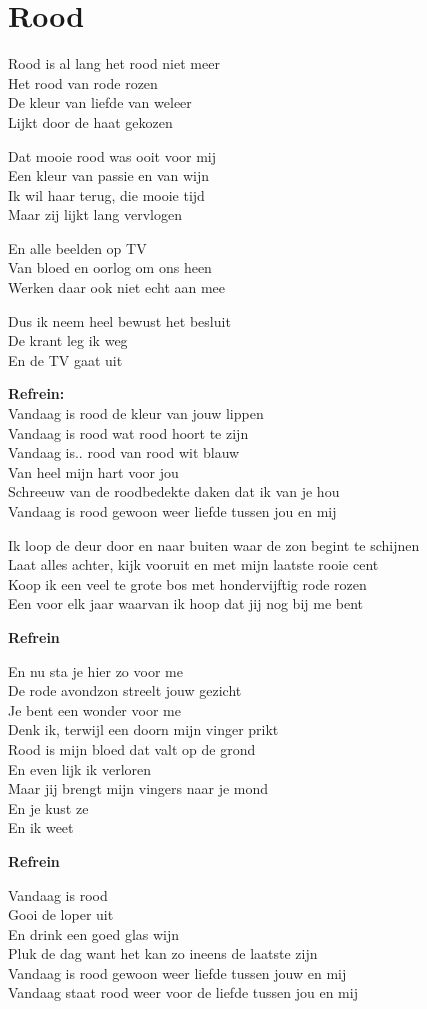 \section{Rood}
Rood is al lang het rood niet meer\\
Het rood van rode rozen\\
De kleur van liefde van weleer\\
Lijkt door de haat gekozen

Dat mooie rood was ooit voor mij\\
Een kleur van passie en van wijn\\
Ik wil haar terug, die mooie tijd\\
Maar zij lijkt lang vervlogen

En alle beelden op TV\\
Van bloed en oorlog om ons heen\\
Werken daar ook niet echt aan mee

Dus ik neem heel bewust het besluit\\
De krant leg ik weg\\
En de TV gaat uit

\textbf{Refrein:}\\
Vandaag is rood de kleur van jouw lippen\\
Vandaag is rood wat rood hoort te zijn\\
Vandaag is.. rood van rood wit blauw\\
Van heel mijn hart voor jou\\
Schreeuw van de roodbedekte daken dat ik van je hou\\
Vandaag is rood gewoon weer liefde tussen jou en mij

Ik loop de deur door en naar buiten waar de zon begint te schijnen\\
Laat alles achter, kijk vooruit en met mijn laatste rooie cent\\
Koop ik een veel te grote bos met hondervijftig rode rozen\\
Een voor elk jaar waarvan ik hoop dat jij nog bij me bent

\textbf{Refrein}

En nu sta je hier zo voor me\\
De rode avondzon streelt jouw gezicht\\
Je bent een wonder voor me\\
Denk ik, terwijl een doorn mijn vinger prikt\\
Rood is mijn bloed dat valt op de grond\\
En even lijk ik verloren\\
Maar jij brengt mijn vingers naar je mond\\
En je kust ze\\
En ik weet

\textbf{Refrein}

Vandaag is rood\\
Gooi de loper uit\\
En drink een goed glas wijn\\
Pluk de dag want het kan zo ineens de laatste zijn\\
Vandaag is rood gewoon weer liefde tussen jouw en mij\\
Vandaag staat rood weer voor de liefde tussen jou en mij

